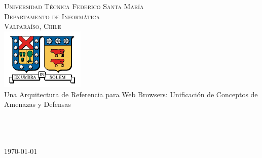 \begin{titlepage}

\begin{center}

\textsc{\Large Universidad Técnica Federico Santa María}\\
\textsc{\large Departamento de Informática}\\
\textsc{\large Valparaíso, Chile}\\[1.5cm]

\includegraphics[width=0.3\textwidth]{figures/utfsm.jpg}\\[1cm]    

{ \huge Una Arquitectura de Referencia para Web Browsers: Unificación de Conceptos de Amenazas y Defensas }\\[2cm]

\\[2cm]
\\[3cm]
\\

\vfill

{\large \today}

\end{center}

\end{titlepage}
